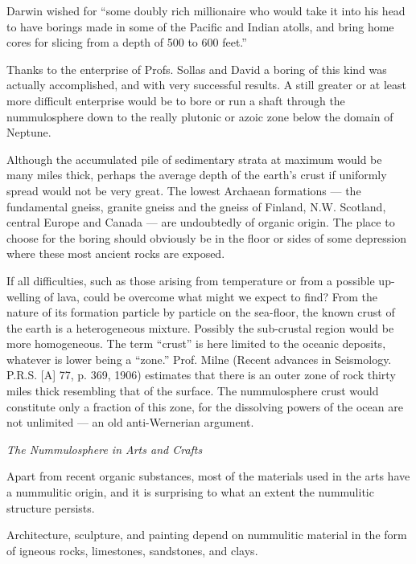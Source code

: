 \documentclass[a4paper, 12pt, oneside, landscape]{article}
\begin{document}
Darwin wished for ``some doubly rich millionaire who would take it into his head to have borings made in some of the Pacific and Indian atolls, and bring home cores for slicing from a depth of 500 to 600 feet.''

Thanks to the enterprise of Profs. Sollas and David a boring of this kind was actually accomplished, and with very successful results. A still greater or at least more difficult enterprise would be to bore or run a shaft through the nummulosphere down to the really plutonic or azoic zone below the domain of Neptune.

Although the accumulated pile of sedimentary strata at maximum would be many miles thick, perhaps the average depth of the earth's crust if uniformly spread would not be very great. The lowest Archaean formations --- the fundamental gneiss, granite gneiss and the gneiss of Finland, N.W. Scotland, central Europe and Canada --- are undoubtedly of organic origin. The place to choose for the boring should obviously be in the floor or sides of some depression where these most ancient rocks are exposed.

If all difficulties, such as those arising from temperature or from a possible up-welling of lava, could be overcome what might we expect to find? From the nature of its formation particle by particle on the sea-floor, the known crust of the earth is a heterogeneous mixture. Possibly the sub-crustal region would be more homogeneous. The term ``crust'' is here limited to the oceanic deposits, whatever is lower being a ``zone.'' Prof. Milne (Recent advances in Seismology. P.R.S. [A] 77, p. 369, 1906) estimates that there is an outer zone of rock thirty miles thick resembling that of the surface. The nummulosphere crust would constitute only a fraction of this zone, for the dissolving powers of the ocean are not unlimited --- an old anti-Wernerian argument.

\centerline{\emph{The Nummulosphere in Arts and Crafts}}

Apart from recent organic substances, most of the materials used in the arts have a nummulitic origin, and it is surprising to what an extent the nummulitic structure persists.

Architecture, sculpture, and painting depend on nummulitic material in the form of igneous rocks, limestones, sandstones, and clays.
\end{document}
